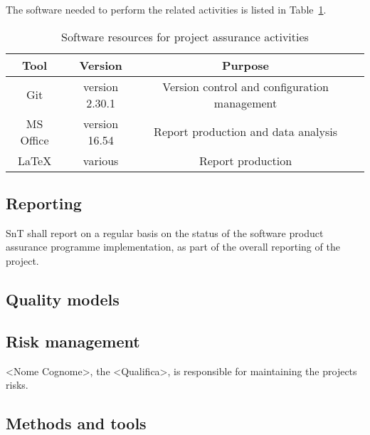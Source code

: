 The software needed to perform the related activities is listed in Table~\ref{table:software_resources}.

\begin{table}[H]
\centering
\begin{tabular}{||c|c|c|c||}
 \hline
 \textbf{Tool} & \textbf{Version} & \textbf{Purpose}\\
 \hline
 Git & version 2.30.1 & Version control and configuration management \\
 MS Office & version 16.54 & Report production and data analysis \\
 LaTeX & various & Report production \\
 \hline
\end{tabular}
\caption{Software resources for project assurance activities}
\label{table:software_resources}
\end{table}

\subsection{Reporting}
SnT shall report on a regular basis on the status of the software product assurance programme implementation, as part of the overall reporting of the project.

\subsection{Quality models}

\subsection{Risk management}
<Nome Cognome>, the <Qualifica>, is responsible for maintaining the projects risks.



\subsection{Methods and tools}

